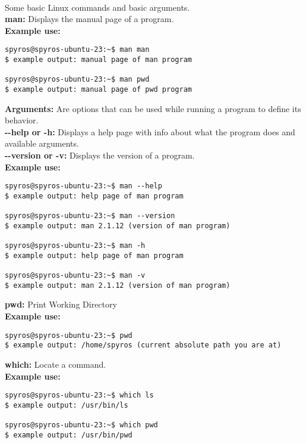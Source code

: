 \documentclass{article}
\begin{document}
\paragraph{} Some basic Linux commands and basic arguments.\\\newline
\textbf{man:} Displays the manual page of a program.\\\newline
\textbf{Example use:}
\begin{lstlisting}
spyros@spyros-ubuntu-23:~$ man man
$ example output: manual page of man program

spyros@spyros-ubuntu-23:~$ man pwd
$ example output: manual page of pwd program
\end{lstlisting}
\textbf{Arguments:} Are options that can be used while running a program to define its behavior.\\
\textbf{-{}-help or -h: } Displays a help page with info about what the program does and available arguments.\\
\textbf{-{}-version or -v: } Displays the version of a program.\\\newline
\textbf{Example use:}
\begin{lstlisting}
spyros@spyros-ubuntu-23:~$ man --help
$ example output: help page of man program

spyros@spyros-ubuntu-23:~$ man --version
$ example output: man 2.1.12 (version of man program)

spyros@spyros-ubuntu-23:~$ man -h
$ example output: help page of man program

spyros@spyros-ubuntu-23:~$ man -v
$ example output: man 2.1.12 (version of man program)
\end{lstlisting}
\textbf{pwd:} Print Working Directory\\\newline
\textbf{Example use:}
\begin{lstlisting}
spyros@spyros-ubuntu-23:~$ pwd
$ example output: /home/spyros (current absolute path you are at)
\end{lstlisting}
\textbf{which:} Locate a command.\\\newline
\textbf{Example use:}
\begin{lstlisting}
spyros@spyros-ubuntu-23:~$ which ls
$ example output: /usr/bin/ls

spyros@spyros-ubuntu-23:~$ which pwd
$ example output: /usr/bin/pwd
\end{lstlisting}
\end{document}
